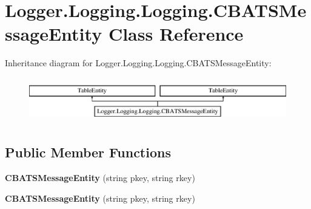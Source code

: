 \hypertarget{class_logger_1_1_logging_1_1_logging_1_1_c_b_a_t_s_message_entity}{}\section{Logger.\+Logging.\+Logging.\+C\+B\+A\+T\+S\+Message\+Entity Class Reference}
\label{class_logger_1_1_logging_1_1_logging_1_1_c_b_a_t_s_message_entity}
Inheritance diagram for Logger.\+Logging.\+Logging.\+C\+B\+A\+T\+S\+Message\+Entity\+:\begin{figure}[H]
\begin{center}
\leavevmode
\includegraphics[height=1.964912cm]{class_logger_1_1_logging_1_1_logging_1_1_c_b_a_t_s_message_entity}
\end{center}
\end{figure}
\subsection*{Public Member Functions}
\begin{DoxyCompactItemize}
\item 
{\bfseries C\+B\+A\+T\+S\+Message\+Entity} (string pkey, string rkey)\hypertarget{class_logger_1_1_logging_1_1_logging_1_1_c_b_a_t_s_message_entity_ac00d1ec7e6dd95b76bd5a2d21ec821f3}{}\label{class_logger_1_1_logging_1_1_logging_1_1_c_b_a_t_s_message_entity_ac00d1ec7e6dd95b76bd5a2d21ec821f3}

\item 
{\bfseries C\+B\+A\+T\+S\+Message\+Entity} (string pkey, string rkey)\hypertarget{class_logger_1_1_logging_1_1_logging_1_1_c_b_a_t_s_message_entity_ac00d1ec7e6dd95b76bd5a2d21ec821f3}{}\label{class_logger_1_1_logging_1_1_logging_1_1_c_b_a_t_s_message_entity_ac00d1ec7e6dd95b76bd5a2d21ec821f3}

\end{DoxyCompactItemize}
